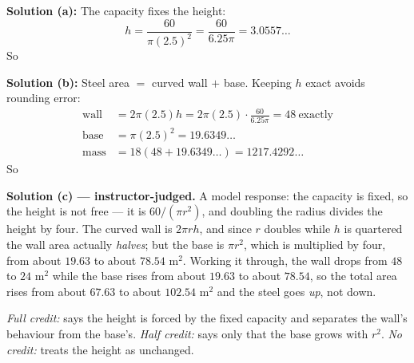 \documentclass[12pt]{article}
\begin{document}

\textbf{Solution (a):} The capacity fixes the height:
\[ h = \frac{60}{\pi (2.5)^2} = \frac{60}{6.25\pi} = 3.0557\ldots \]
So 

\textbf{Solution (b):} Steel area $=$ curved wall $+$ base. Keeping $h$ exact avoids rounding error:
\begin{align*}
  \text{wall} &= 2\pi (2.5) h = 2\pi (2.5)\cdot \frac{60}{6.25\pi} = 48 \ \text{exactly} \\
  \text{base} &= \pi (2.5)^2 = 19.6349\ldots \\
  \text{mass} &= 18 (48 + 19.6349\ldots) = 1217.4292\ldots
\end{align*}
So 

\textbf{Solution (c) --- instructor-judged.} A model response: the capacity is fixed, so the height is not free --- it is $60/(\pi r^2)$, and doubling the radius divides the height by four. The curved wall is $2\pi r h$, and since $r$ doubles while $h$ is quartered the wall area actually \emph{halves}; but the base is $\pi r^2$, which is multiplied by four, from about $19.63$ to about $78.54$ m$^2$. Working it through, the wall drops from $48$ to $24$ m$^2$ while the base rises from about $19.63$ to about $78.54$, so the total area rises from about $67.63$ to about $102.54$ m$^2$ and the steel goes \emph{up}, not down.

\emph{Full credit:} says the height is forced by the fixed capacity and separates the wall's behaviour from the base's. \emph{Half credit:} says only that the base grows with $r^2$. \emph{No credit:} treats the height as unchanged.
\end{document}
